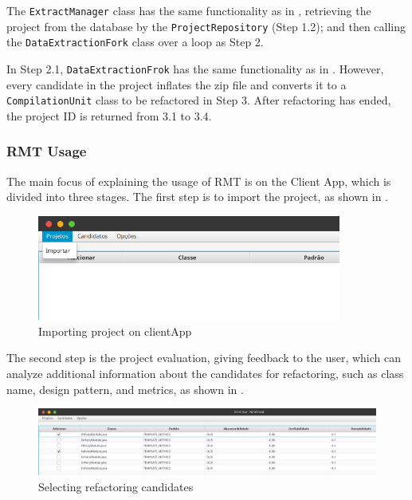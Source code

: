 The \texttt{ExtractManager} class has the same functionality as in , retrieving the project from the database by the \texttt{ProjectRepository} (Step 1.2); and then calling the \texttt{DataExtractionFork} class over a loop as Step 2.

 In Step 2.1, \texttt{DataExtractionFrok} has the same functionality as in . However, every candidate in the project inflates the zip file and converts it to a \texttt{CompilationUnit} class to be refactored in Step 3. After refactoring has ended, the project ID is returned from 3.1 to 3.4.

\subsubsection{RMT Usage}
\label{sub-usage}

The main focus of explaining the usage of RMT is on the Client App, which is divided into three stages. The first step is to import the project, as shown in .

\begin{figure}[ht!]
\SetCaptionWidth{\textwidth}
\caption{Importing project on clientApp}
\label{fig-import}
\includegraphics[width =100mm]{Chapter-2/Figures/import.png}
\end{figure}
\FloatBarrier

The second step is the project evaluation, giving feedback to the user, which can analyze additional information about the candidates for refactoring, such as class name, design pattern, and metrics, as shown in .

\begin{figure}[ht!]
\SetCaptionWidth{\textwidth}
\caption{Selecting refactoring candidates}
\label{fig-choose}
\includegraphics[width =\textwidth]{Chapter-2/Figures/choose.png}
\end{figure}
\FloatBarrier

